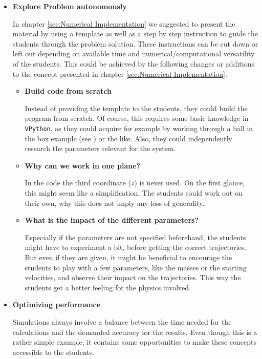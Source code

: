 \documentclass[12pt,ngerman,american]{iopart}
\begin{document}
\begin{itemize}

\item \textbf{Explore Problem autonomously}

In chapter \ref{sec:Numerical Implementation} we suggested to present the material by using a template as well as a step by step instruction to guide the students through the problem solution.
These instructions can be cut down or left out depending on available time and numerical/computational versatility of the students.
This could be achieved by the following changes or additions to the concept presented in chapter \ref{sec:Numerical Implementation}.

\begin{itemize}
\item \textbf{Build code from scratch}

Instead of providing the template to the students, they could build the program from scratch.
Of course, this requires some basic knowledge in \texttt{VPython}, as they could acquire for example by working through a ball in the box example (see \cite{VPythonIntro}) or the like.
Also, they could independently research the parameters relevant for the system.
\item \textbf{Why can we work in one plane?}

In the code the third coordinate ($z$) is never used.
On the first glance, this might seem like a simplification.
The students could work out on their own, why this does not imply any loss of generality.
\item \textbf{What is the impact of the different parameters?}

Especially if the parameters are not specified beforehand, the students might have to experiment a bit, before getting the correct trajectories.
But even if they are given, it might be beneficial to encourage the students to play with a few parameters, like the masses or the starting velocities, and observe their impact on the trajectories.
This way the students get a better feeling for the physics involved.
\end{itemize}

\item \textbf{Optimizing performance}

Simulations always involve a balance between the time needed for the calculations and the demanded accuracy for the results.
Even though this is a rather simple example, it contains some opportunities to make these concepts accessible to the students.


\end{itemize}
\end{document}
